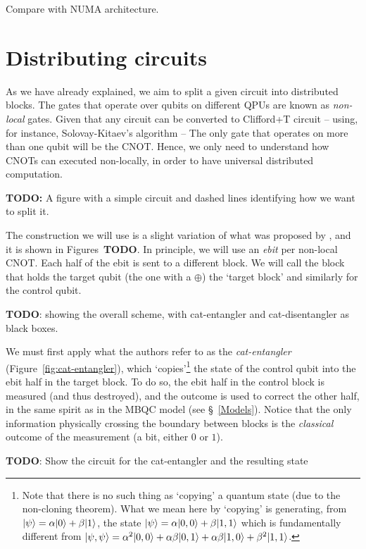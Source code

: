 Compare with NUMA architecture.

\section{Distributing circuits}
\label{IntroDistributing}

As we have already explained, we aim to split a given circuit into distributed blocks. The gates that operate over qubits on different QPUs are known as \textit{non-local} gates. Given that any circuit can be converted to Clifford+T circuit -- using, for instance, Solovay-Kitaev's algorithm -- The only gate that operates on more than one qubit will be the CNOT. Hence, we only need to understand how CNOTs can executed non-locally, in order to have universal distributed computation.

\textbf{TODO:} A figure with a simple circuit and dashed lines identifying how we want to split it.

The construction we will use is a slight variation of what was proposed by \citet{NonLocalCNOT}, and it is shown in Figures~\textbf{TODO}. In principle, we will use an \textit{ebit} per non-local CNOT. Each half of the ebit is sent to a different block. We will call the block that holds the target qubit (the one with a \(\oplus\)) the `target block' and similarly for the control qubit. 

\textbf{TODO}: showing the overall scheme, with cat-entangler and cat-disentangler as black boxes.

We must first apply what the authors refer to as the \textit{cat-entangler} (Figure~\ref{fig:cat-entangler}), which `copies'\footnote{Note that there is no such thing as `copying' a quantum state (due to the non-cloning theorem). What we mean here by `copying' is generating, from \(\vert \psi \rangle = \alpha\vert 0 \rangle + \beta\vert 1 \rangle\), the state \(\vert \psi \rangle = \alpha\vert 0,0 \rangle + \beta\vert 1,1 \rangle\) which is fundamentally different from \(\vert \psi,\psi \rangle = \alpha^2\vert 0,0 \rangle + \alpha\beta\vert 0,1 \rangle + \alpha\beta\vert 1,0 \rangle + \beta^2\vert 1,1 \rangle\).} the state of the control qubit into the ebit half in the target block. To do so, the ebit half in the control block is measured (and thus destroyed), and the outcome is used to correct the other half, in the same spirit as in the MBQC model (see \S~\ref{Models}). Notice that the only information physically crossing the boundary between blocks is the \textit{classical} outcome of the measurement (a bit, either \(0\) or \(1\)).

\textbf{TODO}: Show the circuit for the cat-entangler and the resulting state

